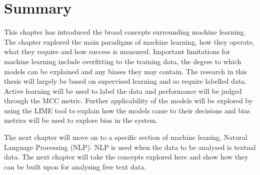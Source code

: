 \section{Summary}

This chapter has introduced the broad concepts surrounding machine learning. The chapter explored the main paradigms of machine learning, how they operate, what they require and how success is measured. Important limitations for machine learning include overfitting to the training data, the degree to which models can be explained and any biases they may contain. The research in this thesis will largely be based on supervised learning and so require labelled data. Active learning will be used to label the data and performance will be judged through the MCC metric. Further applicability of the models will be explored by using the LIME tool to explain how the models came to their decisions and bias metrics will be used to explore bias in the system.

The next chapter will move on to a specific section of machine leaning, Natural Language Processing (NLP). NLP is used when the data to be analysed is textual data. The next chapter will take the concepts explored here and show how they can be built upon for analysing free text data.

